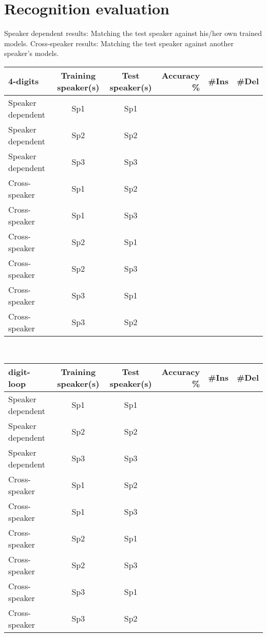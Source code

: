 \documentclass[onecolumn]{article}
\begin{document}
\section*{Recognition evaluation}
Speaker dependent results: Matching the test speaker against his/her own trained models. Cross-speaker results: Matching the test speaker against another speaker’s models.\\[5mm]
\begin{tabular}{|l|c|c|r|r|r|}
\hline
\textbf{4-digits}  & Training speaker(s) & Test speaker(s) & Accuracy \% & \#Ins & \#Del \\
\hline
Speaker dependent & Sp1 & Sp1 & & & \\\hline
Speaker dependent & Sp2 & Sp2 & & & \\\hline
Speaker dependent & Sp3 & Sp3 & & & \\\hline
Cross-speaker & Sp1 & Sp2 & & & \\\hline
Cross-speaker & Sp1 & Sp3 & & & \\\hline
Cross-speaker & Sp2 & Sp1 & & & \\\hline
Cross-speaker & Sp2 & Sp3 & & & \\\hline
Cross-speaker & Sp3 & Sp1 & & & \\\hline
Cross-speaker & Sp3 & Sp2 & & & \\\hline
\end{tabular}\\[5mm]
\begin{tabular}{|l|c|c|r|r|r|}
\hline
\textbf{digit-loop}  & Training speaker(s) & Test speaker(s) & Accuracy \% & \#Ins & \#Del \\
\hline
Speaker dependent & Sp1 & Sp1 & & & \\\hline
Speaker dependent & Sp2 & Sp2 & & & \\\hline
Speaker dependent & Sp3 & Sp3 & & & \\\hline
Cross-speaker & Sp1 & Sp2 & & & \\\hline
Cross-speaker & Sp1 & Sp3 & & & \\\hline
Cross-speaker & Sp2 & Sp1 & & & \\\hline
Cross-speaker & Sp2 & Sp3 & & & \\\hline
Cross-speaker & Sp3 & Sp1 & & & \\\hline
Cross-speaker & Sp3 & Sp2 & & & \\\hline
\end{tabular}
\end{document}
